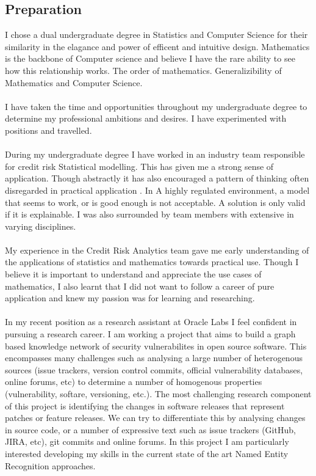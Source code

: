 \subsection*{Preparation}
I chose a dual undergraduate degree in Statistics and Computer Science for their similarity in the elagance and power of efficent and intuitive design. Mathematics is the backbone of Computer science and believe I have the rare ability to see how this relationship works. The order of mathematics. Generalizibility of Mathematics and Computer Science.\\
\\
I have taken the time and opportunities throughout my undergraduate degree to determine my professional ambitions and desires. I have experimented with positions and travelled.\\
\\
During my undergraduate degree I have worked in an industry team responsible for credit risk Statistical modelling. This has  given me a strong sense of application. Though abstractly it has also encouraged a pattern of thinking often disregarded in practical application . In A highly regulated environment, a model that seems to work, or is good enough is not acceptable. A solution is only valid if it is explainable. I was also surrounded by team members with extensive in varying disciplines. \\
\\
My experience in the Credit Risk Analytics team gave me early understanding of the applications of statistics and mathematics towards practical use. Though I believe it is important to understand and appreciate the use cases of mathematics, I also learnt that I did not want to follow a career of pure application and knew my passion was for learning and researching.\\ 
\\
In my recent position as a research assistant at Oracle Labs I feel confident in pursuing a research career. I am working a project that aims to build a graph based knowledge network of security vulnerabilites in open source software. This encompasses many challenges such as analysing a large number of heterogenous sources (issue trackers, version control commits, official vulnerability databases, online forums, etc) to determine a number of homogenous properties (vulnerability, softare, versioning, etc.). The most challenging research component of this project is identifying the changes in software releases that represent patches or feature releases. We can try to differentiate this by analysing changes in source code, or a number of expressive text such as issue trackers (GitHub, JIRA, etc), git commits and online forums. In this project I am particularly interested developing my skills in the current state of the art Named Entity Recognition approaches.\\
